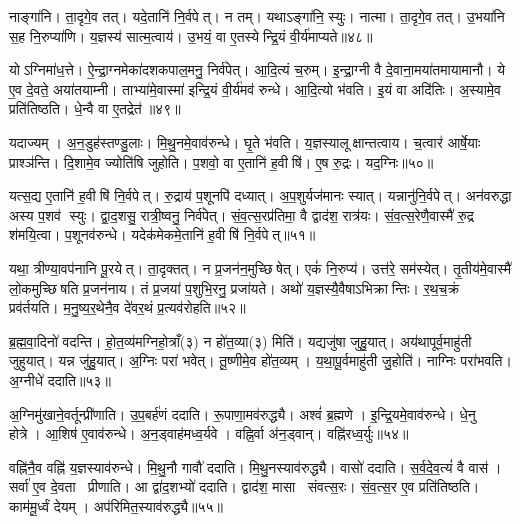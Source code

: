नाङ्गा॑नि। ता॒दृगे॒व तत्। यदे॒तानि॑ नि॒र्वपेत्। न तम्। यथाऽङ्गा॑नि॒ स्युः। नात्मा। ता॒दृगे॒व तत्। उ॒भया॑नि स॒ह नि॒रुप्या॑णि। य॒ज्ञस्य॑ सात्म॒त्वाय॑। उ॒भयं॒ वा ए॒तस्येन्द्रि॒यं वी॒र्य॑माप्यते॥४८॥

योऽग्निमा॑ध॒त्ते। ऐ॒न्द्रा॒ग्नमेका॑दशकपाल॒मनु॒ निर्व॑पेत्। आ॒दि॒त्यं च॒रुम्। इ॒न्द्रा॒ग्नी वै दे॒वाना॒मया॑तमायामानौ। ये ए॒व दे॒वते॒ अया॑तयाम्नी। ताभ्या॑मे॒वास्मा॑ इन्द्रि॒यं वी॒र्य॑मव॑ रुन्धे। आ॒दि॒त्यो भ॑वति। इ॒यं वा अदि॑तिः। अ॒स्यामे॒व प्रति॑तिष्ठति। धे॒न्वै वा ए॒तद्रेत॑॥४९॥

यदाज्यम्। अ॒न॒डुह॑स्तण्डु॒लाः। मि॒थु॒नमे॒वाव॑रुन्धे। घृ॒ते भ॑वति। य॒ज्ञस्यालूक्षान्तत्वाय। च॒त्वार॑ आर्\mbox{}षे॒याः प्राश्ञ॑न्ति। दि॒शामे॒व ज्योति॑षि जुहोति। प॒शवो॒ वा ए॒तानि॑ ह॒वीषि॑। ए॒ष रु॒द्रः। यद॒ग्निः॥५०॥

यत्स॒द्य ए॒तानि॑ ह॒वीषि॑ नि॒र्वपेत्। रु॒द्राय॑ प॒शूनपि॑ दध्यात्। अ॒प॒शुर्यज॑मानः स्यात्। यन्नानु॑नि॒र्वपेत्। अन॑वरुद्धा अस्य प॒शव॑ स्युः। द्वा॒द॒शसु॒ रात्री॒ष्वनु॒ निर्व॑पेत्। सं॒व॒त्स॒रप्र॑तिमा॒ वै द्वाद॑श॒ रात्र॑यः। सं॒व॒त्स॒रेणै॒वास्मै॑ रु॒द्र श॑मयि॒त्वा। प॒शूनव॑रुन्धे। यदेक॑मेकमे॒तानि॑ ह॒वीषि॑ नि॒र्वपेत्॥५१॥

यथा॒ त्रीण्या॒वप॑नानि पू॒रयेत्। ता॒दृक्तत्। न प्र॒जन॑न॒\-मुच्छिषेत्। एकं॑ नि॒रुप्य॑। उत्त॑रे॒ सम॑स्येत्। तृ॒तीय॑मे॒वास्मै॑ लो॒कमुच्छिषति प्र॒जन॑नाय। तं प्र॒जया॑ प॒शुभि॒रनु॒ प्रजा॑यते। अथो॑ य॒ज्ञस्यै॒वैषाऽभिक्रान्तिः। र॒थ॒च॒क्रं प्रव॑र्तयति। म॒नु॒ष्य॒र॒थेनै॒व दे॑वर॒थं प्र॒त्यव॑रोहति॥५२॥

ब्र॒ह्म॒वा॒दिनो॑ वदन्ति। हो॒त॒व्य॑मग्निहो॒त्राँ(३) न हो॑त॒व्या(३) मिति॑। यद्यजु॑षा जुहु॒यात्। अय॑थापूर्व॒माहु॑ती जुहुयात्। यन्न जु॑हु॒यात्। अ॒ग्निः परा॑ भवेत्। तू॒ष्णीमे॒व हो॑त॒व्यम्। य॒था॒पू॒र्वमाहु॑ती जु॒होति॑। नाग्निः परा॑भवति। अ॒ग्नीधे॑ ददाति॥५३॥

अ॒ग्निमु॑खाने॒वर्तून्प्री॑णाति। उ॒प॒बर्\mbox{}ह॑णं ददाति। रू॒पाणा॒मव॑\-रुद्ध्यै। अश्वं॑ ब्र॒ह्मणे। इ॒न्द्रि॒यमे॒वाव॑रुन्धे। धे॒नु होत्रे। आ॒शिष॑ ए॒वाव॑रुन्धे। अ॒न॒ड्वाह॑मध्व॒र्यवे। वह्नि॒र्वा अ॑न॒ड्वान्। वह्नि॑रध्व॒र्युः॥५४॥

वह्नि॑नै॒व वह्नि॑ य॒ज्ञस्याव॑रुन्धे। मि॒थु॒नौ गावौ॑ ददाति। मि॒थु॒नस्याव॑रुद्ध्यै। वासो॑ ददाति। स॒र्व॒दे॒व॒त्यं॑ वै वास॑। सर्वा॑ ए॒व दे॒वता प्रीणाति। आ द्वा॑द॒शभ्यो॑ ददाति। द्वाद॑श॒ मासा संवत्स॒रः। सं॒व॒त्स॒र ए॒व प्रति॑तिष्ठति। काम॑मू॒र्ध्वं देयम्। अप॑रिमित॒स्याव॑रुद्ध्यै॥५५॥\anuvakamend[आ॒दि॒त्ये तृती॑यम॒प्स्वासी॒त्तत्तेनावा॑रुन्धत॒ स्यादाप्यते॒ रेतो॒ऽग्निरेक॑मेकमे॒तानि॑ ह॒वीषि॑ नि॒र्वपेत्प्र॒त्यव॑रोहति ददात्यध्व॒र्युर्देय॒मेकं॑ च]

